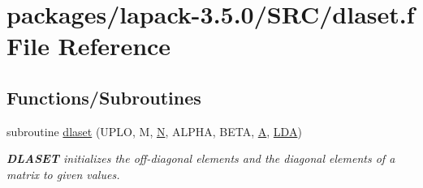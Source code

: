 \hypertarget{dlaset_8f}{}\section{packages/lapack-\/3.5.0/\+S\+R\+C/dlaset.f File Reference}
\label{dlaset_8f}
\subsection*{Functions/\+Subroutines}
\begin{DoxyCompactItemize}
\item 
subroutine \hyperlink{group__auxOTHERauxiliary_ga89e332374c7cd87e5db54bfe21550bc3}{dlaset} (U\+P\+L\+O, M, \hyperlink{polmisc_8c_a0240ac851181b84ac374872dc5434ee4}{N}, A\+L\+P\+H\+A, B\+E\+T\+A, \hyperlink{classA}{A}, \hyperlink{example__user_8c_ae946da542ce0db94dced19b2ecefd1aa}{L\+D\+A})
\begin{DoxyCompactList}\small\item\em {\bfseries D\+L\+A\+S\+E\+T} initializes the off-\/diagonal elements and the diagonal elements of a matrix to given values. \end{DoxyCompactList}\end{DoxyCompactItemize}
